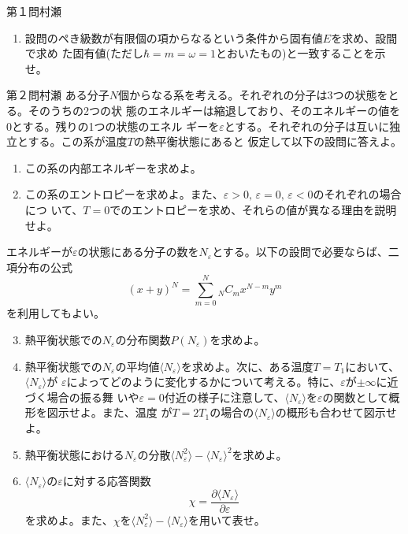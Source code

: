 \begin{question}{第１問}{村瀬}
\begin{enumerate}
  設問で求めた$\psi_0$を用いて$R(r)=f(r)\psi_0(r)$と書き換えると、$f(r)$に対する微分方程
  式は
  \[
    \frac{d^2f}{dr^2} + \frac1r(1-2r^2)\frac{df}{dr}
    +\left(2E-2-\frac{n^2}{r^2}\right)f = 0
  \]
  となる。$f(r)$を
  \[
    f(r) = r^\alpha \sum_{s=0}^\infty f_sr^s,\quad (f_0=1)
  \]
  のようにべき級数展開するとき、$f(r)$が原点$r=0$で発散しないという条件を用いて実
  数パラメータ$\alpha$を決定せよ。
\item
  設問のペき級数が有限個の項からなるという条件から固有値$E$を求め、設間で求め
  た固有値(ただし$\hbar=m=\omega=1$とおいたもの)と一致することを示せ。
\end{enumerate}
\end{question}

\begin{question}{第２問}{村瀬}
ある分子$N$個からなる系を考える。それぞれの分子は3つの状態をとる。そのうちの2つの状
態のエネルギーは縮退しており、そのエネルギーの値を0とする。残りの1つの状態のエネル
ギーを$\varepsilon$とする。それぞれの分子は互いに独立とする。この系が温度$T$の熱平衡状態にあると
仮定して以下の設問に答えよ。
\begin{enumerate}
\item
  この系の内部エネルギーを求めよ。
\item
  この系のエントロピーを求めよ。また、$\varepsilon>0,\,\varepsilon=0,\,\varepsilon<0$のそれぞれの場合につ
  いて、$T=0$でのエントロピーを求め、それらの値が異なる理由を説明せよ。
\end{enumerate}
\def\Ne{N_\varepsilon}
エネルギーが$\varepsilon$の状態にある分子の数を$\Ne$とする。以下の設問で必要ならば、二項分布の公式
\[
  (x+y)^N = \sum_{m=0}^N {}_NC_m x^{N-m} y^m
\]
を利用してもよい。
\begin{enumerate}
\setcounter{enumi}{2}
\item 熱平衡状態での$\Ne$の分布関数$P(\Ne)$を求めよ。
\item 熱平衡状態での$\Ne$の平均値$\langle\Ne\rangle$を求めよ。次に、ある温度$T=T_1$において、$\langle\Ne\rangle$が
  $\varepsilon$によってどのように変化するかについて考える。特に、$\varepsilon$が$\pm\infty$に近づく場合の振る舞
  いや$\varepsilon=0$付近の様子に注意して、$\langle\Ne\rangle$を$\varepsilon$の関数として概形を図示せよ。また、温度
  が$T=2T_1$の場合の$\langle\Ne\rangle$の概形も合わせて図示せよ。
\item 熱平衡状態における$\Ne$の分散$\langle\Ne^2\rangle - \langle\Ne\rangle^2$を求めよ。
\item $\langle\Ne\rangle$の$\varepsilon$に対する応答関数
  \[
    \chi = \frac{\partial \langle\Ne\rangle}{\partial \varepsilon}
  \]
  を求めよ。また、$\chi$を$\langle\Ne^2\rangle-\langle\Ne\rangle$を用いて表せ。
\end{enumerate}
\end{question}

